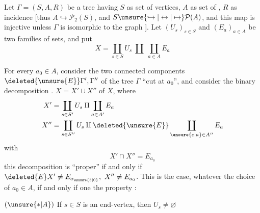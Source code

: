 Let  $\Gamma=(S,A,R)$ be a tree having $S$ as set of vertices, $A$ \unsure{-} as set of , $R$ as incidence  [thus
$A\hookrightarrow\mathcal{P}_2(S)$, and $S\unsure{\hookrightarrow|\leftrightarrow|\mapsto}\mathcal{P}(A)$, and this map is injective unless $\Gamma$ is isomorphic to the graph
\diagram{\begin{tikzcd}[ampersand replacement=\&,column sep=1.4em]
\bullet \arrow[r,dash] \& \bullet
\end{tikzcd}}
]. Let $(U_s)_{s\in S}$ and $(E_a)_{a\in A}$ be two families of sets, and put
\[
X=\coprod_{s\in S}U_s\ \amalg\ \coprod_{a\in A}E_a
\]

For every $a_0\in A$, consider the two connected components $\deleted{\unsure{E}}\Gamma',\Gamma''$ of the tree $\Gamma$ ``cut at $a_0$'', and consider the binary decomposition . $X=X'\cup X''$ of $X$,
where
\[
\begin{aligned}
X'&=\coprod_{s\in S'}U_s\amalg\coprod_{a\in A'}E_a\\
X''&=\coprod_{s\in S''}U_s\amalg\deleted{\unsure{E}}\coprod_{\unsure{c|a}\in A''}E_a
\end{aligned}
\]
with
\[
X'\cap X''=E_{a_0}
\]
this decomposition is ``proper'' if and only if $\deleted{E}X'\ne E_{a_{\unsure{b|0}}},\ X''\ne E_{a_0}$. This is the case, whatever the choice of $a_0\in A$, if and only if one  the  property :

$(\unsure{\ast|A})$ If $s\in S$ is an end-vertex, then $U_s\ne\varnothing$
